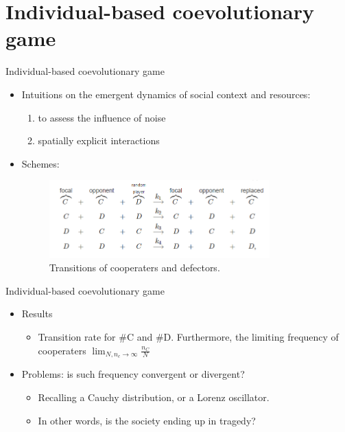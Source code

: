 \documentclass{beamer}
\begin{document}
\section{Individual-based coevolutionary game}
\begin{frame}{Individual-based coevolutionary game}
    \begin{itemize}
        \item Intuitions on the emergent dynamics of social context and resources:
        \begin{enumerate}
            \item to assess the influence of noise
            \item spatially explicit interactions
        \end{enumerate}
        \item Schemes:
        \begin{figure}
            \centering
            \includegraphics[height = 3cm]{scheme.PNG}
            \caption{Transitions of cooperaters and defectors.}
        \end{figure}
    \end{itemize}
\end{frame}

\begin{frame}{Individual-based coevolutionary game}
    \begin{itemize}
        \item Results
        \begin{itemize}
            \item Transition rate for \#C and \#D. Furthermore, the limiting frequency of cooperaters $\lim_{N,n_c\rightarrow \infty}\frac{n_C}{N} $
        \end{itemize}
        \item Problems: is such frequency convergent or divergent?
        \begin{itemize}
            \item Recalling a Cauchy distribution, or a Lorenz oscillator.
            \item In other words, is the society ending up in tragedy?
        \end{itemize}
    \end{itemize}
\end{frame}
\end{document}
